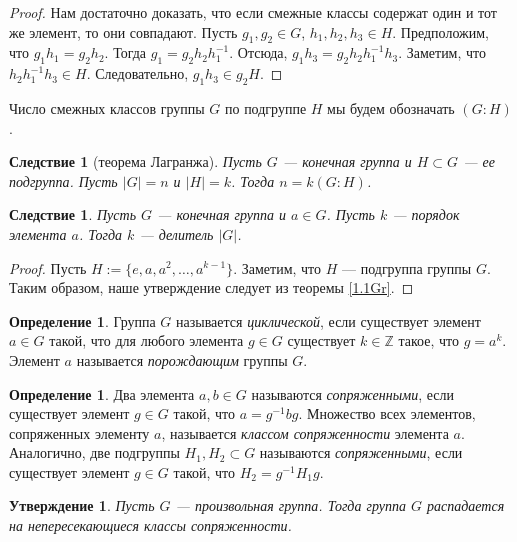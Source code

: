 \documentclass[12pt, titlepage, oneside]{amsbook}
\newcommand{\ZZ}{\mathbb{Z}}
\newtheorem{corollary}[theorem]{Следствие}
\newtheorem{claim}[theorem]{Утверждение}
\theoremstyle{definition}
\newtheorem{definition}[theorem]{Определение}
\theoremstyle{remark}
\begin{document}
\begin{proof}
	Нам достаточно доказать, что если смежные классы содержат один и тот
	же элемент, то они совпадают. Пусть $g_1,g_2\in G$, $h_1,h_2,h_3\in H$. Предположим, что $g_{1}h_{1}=g_{2}h_{2}$. Тогда
	$g_{1}=g_{2}h_{2}h_{1}^{-1}$. Отсюда,
	$g_{1}h_{3}=g_{2}h_{2}h^{-1}_{1}h_{3}$. Заметим, что
	$h_{2}h^{-1}_{1}h_{3}\in H$. Следовательно, $g_{1}h_{3}\in g_{2}H$.
\end{proof}

Число смежных классов группы $G$ по подгруппе $H$ мы будем
обозначать $(G:H)$.

\begin{corollary}[теорема Лагранжа]
	\label{Lagr1}Пусть $G$ --- конечная группа и $H\subset G$ --- ее
	подгруппа. Пусть $|G|=n$ и $|H|=k$. Тогда $n=k(G:H)$.
\end{corollary}

\begin{corollary}
	\label{Lagr2} Пусть $G$ --- конечная группа и $a\in G$. Пусть $k$
	--- порядок элемента $a$. Тогда $k$ --- делитель $|G|$.
\end{corollary}

\begin{proof}
	Пусть $H:=\{e,a,a^2,\dots,a^{k-1}\}$. Заметим, что $H$ --- подгруппа
	группы $G$. Таким образом, наше утверждение следует из теоремы
	\ref{1.1Gr}.
\end{proof}

\begin{definition}
	Группа $G$ называется \emph{циклической}, если существует элемент
	$a\in G$ такой, что для любого элемента $g\in G$ существует
	$k\in\ZZ$ такое, что $g=a^k$. Элемент $a$ называется
	\emph{порождающим} группы $G$.
\end{definition}

\begin{definition}
	Два элемента $a, b\in G$ называются \emph{сопряженными}, если
	существует элемент $g\in G$ такой, что $a=g^{-1}bg$. Множество всех элементов, сопряженных элементу $a$, называется \emph{классом сопряженности} элемента $a$. Аналогично, две подгруппы $H_1,H_2\subset G$ называются \emph{сопряженными}, если
	существует элемент $g\in G$ такой, что $H_2=g^{-1}H_1g$.
\end{definition}

\begin{claim}
	\label{Sopr} Пусть $G$ --- произвольная группа. Тогда группа $G$ распадается на непересекающиеся классы сопряженности.
\end{claim}
\end{document}
